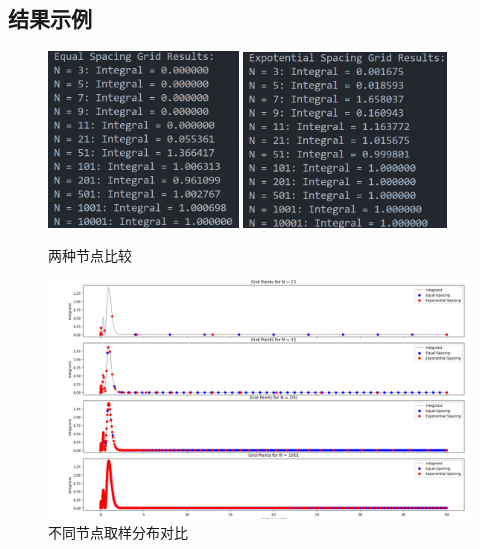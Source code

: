 \subsection{结果示例}
\begin{figure}[H]
    \centering
    \includegraphics[width=0.45\textwidth]{Problem_3/figs/terminal_1.png}
    \includegraphics[width=0.48\textwidth]{Problem_3/figs/terminal_2.png}
    \caption{两种节点比较}
\end{figure}

\begin{figure}[H]
    \centering
    \includegraphics[width=1.0\textwidth]{Problem_3/figs/nodes.png}
    \caption{不同节点取样分布对比}
\end{figure}

